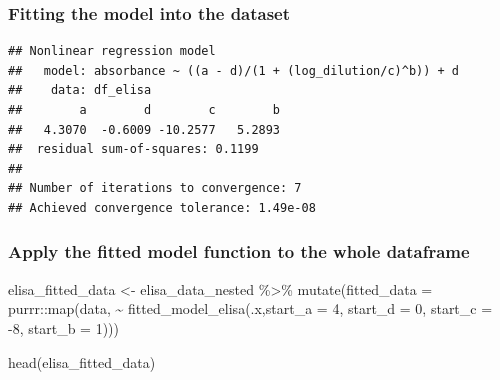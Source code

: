 \documentclass[
]{book}
\newenvironment{Shaded}{\begin{snugshade}}{\end{snugshade}}
\newcommand{\AttributeTok}[1]{\textcolor[rgb]{0.77,0.63,0.00}{#1}}
\newcommand{\DecValTok}[1]{\textcolor[rgb]{0.00,0.00,0.81}{#1}}
\newcommand{\FunctionTok}[1]{\textcolor[rgb]{0.00,0.00,0.00}{#1}}
\newcommand{\NormalTok}[1]{#1}
\newcommand{\OtherTok}[1]{\textcolor[rgb]{0.56,0.35,0.01}{#1}}
\newcommand{\SpecialCharTok}[1]{\textcolor[rgb]{0.00,0.00,0.00}{#1}}
\begin{document}
\hypertarget{fitting-the-model-into-the-dataset}{%
\subsubsection{Fitting the model into the dataset}\label{fitting-the-model-into-the-dataset}}

\begin{Shaded}
\end{Shaded}

\begin{verbatim}
## Nonlinear regression model
##   model: absorbance ~ ((a - d)/(1 + (log_dilution/c)^b)) + d
##    data: df_elisa
##        a        d        c        b 
##   4.3070  -0.6009 -10.2577   5.2893 
##  residual sum-of-squares: 0.1199
## 
## Number of iterations to convergence: 7 
## Achieved convergence tolerance: 1.49e-08
\end{verbatim}

\hypertarget{apply-the-fitted-model-function-to-the-whole-dataframe}{%
\subsubsection{Apply the fitted model function to the whole dataframe}\label{apply-the-fitted-model-function-to-the-whole-dataframe}}

\begin{Shaded}
\begin{Highlighting}[]
\NormalTok{elisa\_fitted\_data }\OtherTok{\textless{}{-}}\NormalTok{ elisa\_data\_nested }\SpecialCharTok{\%\textgreater{}\%}
  \FunctionTok{mutate}\NormalTok{(}\AttributeTok{fitted\_data =} 
\NormalTok{           purrr}\SpecialCharTok{::}\FunctionTok{map}\NormalTok{(data, }\SpecialCharTok{\textasciitilde{}} 
                        \FunctionTok{fitted\_model\_elisa}\NormalTok{(.x,}\AttributeTok{start\_a =} \DecValTok{4}\NormalTok{, }
                                              \AttributeTok{start\_d =} \DecValTok{0}\NormalTok{, }
                                              \AttributeTok{start\_c =} \SpecialCharTok{{-}}\DecValTok{8}\NormalTok{, }
                                              \AttributeTok{start\_b =} \DecValTok{1}\NormalTok{)))}

\FunctionTok{head}\NormalTok{(elisa\_fitted\_data)}
\end{Highlighting}
\end{Shaded}
\end{document}
